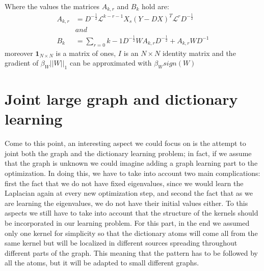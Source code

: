 Where the values the matrices $A_{k,r}$ and $B_k$ hold are:
\begin{align}
A_{k,r} &= D^{-\frac{1}{2}} \mathcal{L}^{k-r-1} X_s (Y - DX)^T \mathcal{L}^r D^{-\frac{1}{2}}\\
&and\\
B_k &= \sum_{r=0}{k-1}D^{-\frac{1}{2}} W A_{k,r} D^{-\frac{1}{2}} + A_{k,r} W D^{-1}
\end{align}
moreover $\textbf{1}_{N\times N}$ is a matrix of ones, $I$ is an $N\times N$ identity matrix and the gradient of $\beta_W||W||_1$ can be approximated with $\beta_W sign(W)$


\section{Joint large graph and dictionary learning}
Come to this point, an interesting aspect we could focus on is the attempt to joint both the graph and the dictionary learning problem; in fact, if we assume that the graph is unknown we could imagine adding a graph learning part to the optimization. In doing this, we have to take into account two main complications: first the fact that we do not have fixed eigenvalues, since we would learn the Laplacian again at every new optimization step, and second the fact that as we are learning the eigenvalues, we do not have their initial values either. To this aspects we still have to take into account that the structure of the kernels should be incorporated in our learning problem. For this part, in the end we assumed only one kernel for simplicity so that the dictionary atoms will come all from the same kernel but will be localized in different sources spreading throughout different parts of the graph. This meaning that the pattern has to be followed by all the atoms, but it will be adapted to small different graphs.


